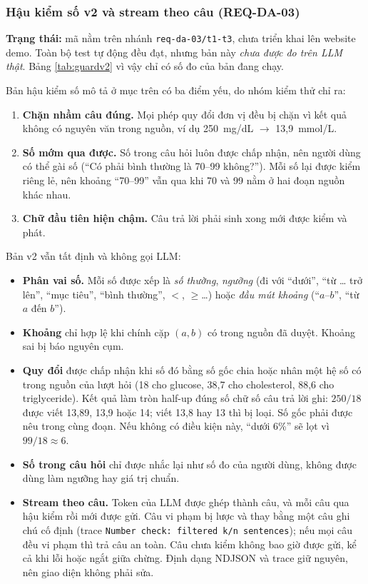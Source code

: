 \subsubsection{Hậu kiểm số v2 và stream theo câu (REQ-DA-03)}\label{sec:guardv2}
\textbf{Trạng thái:} mã nằm trên nhánh \texttt{req-da-03/t1-t3}, chưa triển khai lên website demo. Toàn bộ test tự động đều đạt, nhưng bản này \emph{chưa được đo trên LLM thật}. Bảng \ref{tab:guardv2} vì vậy chỉ có số đo của bản đang chạy.

Bản hậu kiểm số mô tả ở mục trên có ba điểm yếu, do nhóm kiểm thử chỉ ra:
\begin{enumerate}
\item \textbf{Chặn nhầm câu đúng.} Mọi phép quy đổi đơn vị đều bị chặn vì kết quả không có nguyên văn trong nguồn, ví dụ 250~mg/dL $\rightarrow$ 13,9~mmol/L.
\item \textbf{Số mớm qua được.} Số trong câu hỏi luôn được chấp nhận, nên người dùng có thể gài số (“Có phải bình thường là 70--99 không?”). Mỗi số lại được kiểm riêng lẻ, nên khoảng “70--99” vẫn qua khi 70 và 99 nằm ở hai đoạn nguồn khác nhau.
\item \textbf{Chữ đầu tiên hiện chậm.} Câu trả lời phải sinh xong mới được kiểm và phát.
\end{enumerate}

Bản v2 vẫn tất định và không gọi LLM:
\begin{itemize}
\item \textbf{Phân vai số.} Mỗi số được xếp là \emph{số thường}, \emph{ngưỡng} (đi với “dưới”, “từ \dots{} trở lên”, “mục tiêu”, “bình thường”, $<$, $\geq$\dots) hoặc \emph{đầu mút khoảng} (“$a$--$b$”, “từ $a$ đến $b$”).
\item \textbf{Khoảng} chỉ hợp lệ khi chính cặp $(a,b)$ có trong nguồn đã duyệt. Khoảng sai bị báo nguyên cụm.
\item \textbf{Quy đổi} được chấp nhận khi số đó bằng số gốc chia hoặc nhân một hệ số có trong nguồn của lượt hỏi (18 cho glucose, 38,7 cho cholesterol, 88,6 cho triglyceride). Kết quả làm tròn half-up đúng số chữ số câu trả lời ghi: $250/18$ được viết 13,89, 13,9 hoặc 14; viết 13,8 hay 13 thì bị loại. Số gốc phải được nêu trong cùng đoạn. Nếu không có điều kiện này, “dưới 6\%” sẽ lọt vì $99/18 \approx 6$.
\item \textbf{Số trong câu hỏi} chỉ được nhắc lại như số đo của người dùng, không được dùng làm ngưỡng hay giá trị chuẩn.
\item \textbf{Stream theo câu.} Token của LLM được ghép thành câu, và mỗi câu qua hậu kiểm rồi mới được gửi. Câu vi phạm bị lược và thay bằng một câu ghi chú cố định (trace \texttt{Number check: filtered k/n sentences}); nếu mọi câu đều vi phạm thì trả câu an toàn. Câu chưa kiểm không bao giờ được gửi, kể cả khi lỗi hoặc ngắt giữa chừng. Định dạng NDJSON và trace giữ nguyên, nên giao diện không phải sửa.
\end{itemize}

